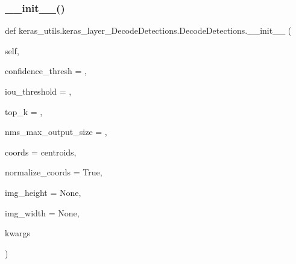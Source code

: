 \subsubsection{\texorpdfstring{\+\_\+\+\_\+init\+\_\+\+\_\+()}{\_\_init\_\_()}}
{\footnotesize\ttfamily def keras\+\_\+utils.\+keras\+\_\+layer\+\_\+\+Decode\+Detections.\+Decode\+Detections.\+\_\+\+\_\+init\+\_\+\+\_\+ (\begin{DoxyParamCaption}\item[{}]{self,  }\item[{}]{confidence\+\_\+thresh = {},  }\item[{}]{iou\+\_\+threshold = {},  }\item[{}]{top\+\_\+k = {},  }\item[{}]{nms\+\_\+max\+\_\+output\+\_\+size = {},  }\item[{}]{coords = {\ttfamily \textquotesingle{}centroids\textquotesingle{}},  }\item[{}]{normalize\+\_\+coords = {\ttfamily True},  }\item[{}]{img\+\_\+height = {\ttfamily None},  }\item[{}]{img\+\_\+width = {\ttfamily None},  }\item[{}]{kwargs }\end{DoxyParamCaption})}

